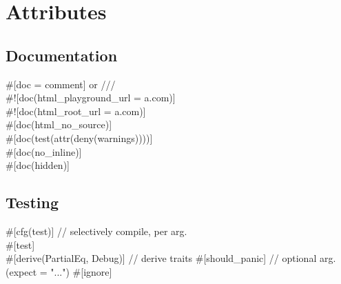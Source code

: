 \section{Attributes}
\subsection*{Documentation}
\#[doc = \textquotedbl comment\textquotedbl] or /// \\
\#![doc(html\_playground\_url = \textquotedbl a.com\textquotedbl)] \\
\#![doc(html\_root\_url = \textquotedbl a.com\textquotedbl)] \\
\#[doc(html\_no\_source)] \\
\#[doc(test(attr(deny(warnings))))] \\
\#[doc(no\_inline)] \\
\#[doc(hidden)] \\
\subsection*{Testing}
\#[cfg(test)] // selectively compile, per arg. \\
\#[test] \\
\#[derive(PartialEq, Debug)] // derive traits
\#[should\_panic] // optional arg. (expect = "...")
\#[ignore]